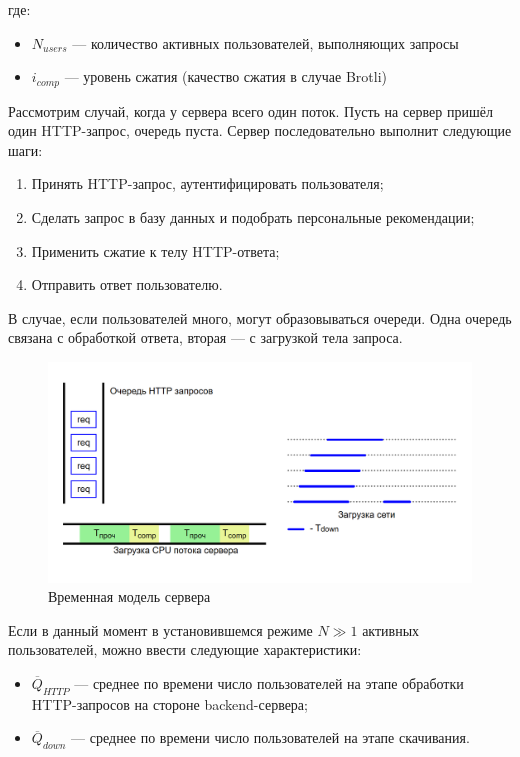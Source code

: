 \documentclass[12pt]{article}
\begin{document}
где:
\begin{itemize}
    \item $N_{users}$ — количество активных пользователей, выполняющих запросы
    \item $i_{comp}$ — уровень сжатия (качество сжатия в случае Brotli)
\end{itemize}

Рассмотрим случай, когда у сервера всего один поток. Пусть на сервер пришёл один HTTP-запрос, очередь пуста. Сервер последовательно выполнит следующие шаги:

\begin{enumerate}
    \item Принять HTTP-запрос, аутентифицировать пользователя;
    \item Сделать запрос в базу данных и подобрать персональные рекомендации;
    \item Применить сжатие к телу HTTP-ответа;
    \item Отправить ответ пользователю.
\end{enumerate}

В случае, если пользователей много, могут образовываться очереди. Одна очередь связана с обработкой ответа, вторая — с загрузкой тела запроса.

\begin{figure}[H]
    \centering
    \includegraphics[width=1\textwidth]{../images/timing-model.png}
    \caption{Временная модель сервера}
\end{figure}

Если в данный момент в установившемся режиме $N \gg 1$ активных пользователей, можно ввести следующие характеристики:

\begin{itemize}
    \item $\overline{Q}_{HTTP}$ — среднее по времени число пользователей на этапе обработки HTTP-запросов на стороне backend-сервера;
    \item $\overline{Q}_{down}$ — среднее по времени число пользователей на этапе скачивания.
\end{itemize}
\end{document}
